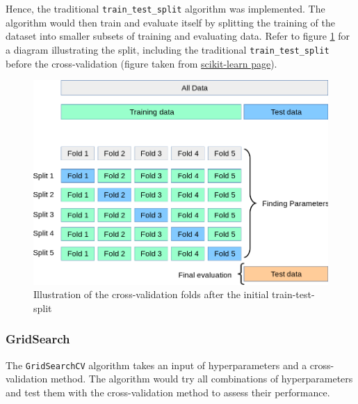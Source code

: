Hence, the traditional \texttt{train\_test\_split} algorithm was implemented. The algorithm would then train and evaluate itself by splitting the training of the dataset into smaller subsets of training and evaluating data. Refer to figure \ref{fig:tts cv} for a diagram illustrating the split, including the traditional \texttt{train\_test\_split} before the cross-validation (figure taken from \href{https://scikit-learn.org/stable/modules/cross_validation.html#cross-validation}{{\color{blue} scikit-learn page}}).

\begin{figure}[H]
    \centering
    \includegraphics[width=\linewidth]{figures/grid_search_cross_validation.png}
    \caption{Illustration of the cross-validation folds after the initial train-test-split}
    \label{fig:tts cv}
\end{figure}

\subsubsection{GridSearch}

The \texttt{GridSearchCV} algorithm takes an input of hyperparameters and a cross-validation method. The algorithm would try all combinations of hyperparameters and test them with the cross-validation method to assess their performance. 
